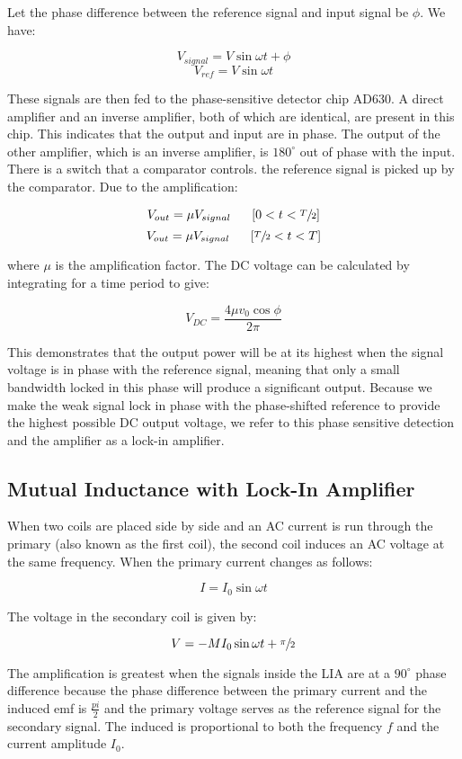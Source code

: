 		Let the phase difference between the reference signal and input signal be $\phi$. We have:


		$$V_{signal} = V\sin\omega t + \phi$$
		$$V_{ref} = V\sin\omega t$$
		
		These signals are then fed to the phase-sensitive detector chip AD630. A direct amplifier and an inverse amplifier, both of which are identical, are present in this chip. This indicates that the output and input are in phase. The output of the other amplifier, which is an inverse amplifier, is $180^\circ$ out of phase with the input. There is a switch that a comparator controls. the reference signal is picked up by the comparator. Due to the amplification:
		
		$$V_{out} = \mu V_{signal} \;\;\;\;\;\; [0<t<\sfrac{T}{2}]$$
		$$V_{out} = \mu V_{signal} \;\;\;\;\;\; [\sfrac{T}{2}<t<T]$$

		where $\mu$ is the amplification factor. The DC voltage can be calculated by integrating for a time period to give:

		$$V_{DC} = \frac{4\mu v_0 \cos\phi}{2\pi}$$

		This demonstrates that the output power will be at its highest when the signal voltage is in phase with the reference signal, meaning that only a small bandwidth locked in this phase will produce a significant output. Because we make the weak signal lock in phase with the phase-shifted reference to provide the highest possible DC output voltage, we refer to this phase sensitive detection and the amplifier as a lock-in amplifier.
	
	\subsection{Mutual Inductance with Lock-In Amplifier}
		When two coils are placed side by side and an AC current is run through the primary (also known as the first coil), the second coil induces an AC voltage at the same frequency. When the primary current changes as follows:

		$$I = I_0 \sin\omega t$$

		The voltage in the secondary coil is given by:

		$$V = -MI_0\sin\omega t + \sfrac{\pi}{2}$$

		The amplification is greatest when the signals inside the LIA are at a $90^\circ$ phase difference because the phase difference between the primary current and the induced emf is $\frac{pi}{2}$ and the primary voltage serves as the reference signal for the secondary signal. The induced is proportional to both the frequency $f$ and the current amplitude $I_0$.

